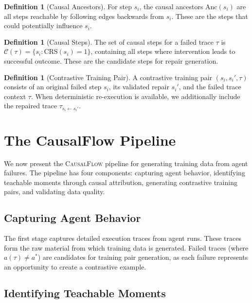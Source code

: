 \documentclass{article}
\theoremstyle{plain}
\theoremstyle{definition}
\newtheorem{definition}[theorem]{Definition}
\theoremstyle{remark}
\begin{document}
\begin{definition}[Causal Ancestors]
For step $s_i$, the causal ancestors $\text{Anc}(s_i)$ are all steps reachable by following edges backwards from $s_i$. These are the steps that could potentially influence $s_i$.
\end{definition}

\begin{definition}[Causal Steps]
The set of causal steps for a failed trace $\tau$ is 
$\mathcal{C}(\tau) = \{s_i : \text{CRS}(s_i) = 1\}$, 
containing all steps where intervention leads to successful outcome. 
These are the candidate steps for repair generation.
\end{definition}

\begin{definition}[Contrastive Training Pair]
A contrastive training pair $(s_i, s_i', \tau)$ consists of an original failed 
step $s_i$, its validated repair $s_i'$, and the failed trace context $\tau$. 
When deterministic re-execution is available, we additionally include the 
repaired trace $\tau_{s_i \leftarrow s_i'}$.
\end{definition}


\section{The CausalFlow Pipeline}

We now present the \textsc{CausalFlow} pipeline for generating training data from agent failures. The pipeline has four components: capturing agent behavior, identifying teachable moments through causal attribution, generating contrastive training pairs, and validating data quality.

\subsection{Capturing Agent Behavior}

The first stage captures detailed execution traces from agent runs. These traces form the raw material from which training data is generated. Failed traces (where $a(\tau) \neq a^*$) are candidates for training pair generation, as each failure represents an opportunity to create a contrastive example.

\subsection{Identifying Teachable Moments}
\end{document}
